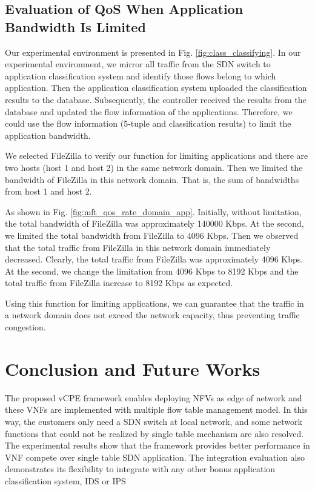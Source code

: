 \documentclass[conference]{IEEEtran}
\begin{document}
\subsection{Evaluation of QoS When Application Bandwidth Is Limited}
Our experimental environment is presented in Fig. \ref{fig:class_classifying}. In our experimental environment, we mirror all traffic from the SDN switch to application classification system and identify those flows belong to which application.
Then the application classification system uploaded the classification results to the database.
Subsequently, the controller received the results from the database and updated the flow information of the applications.
Therefore, we could use the flow information (5-tuple and classification results) to limit the application bandwidth.

We selected FileZilla to verify our function for limiting applications and there are two hosts (host 1 and host 2) in the same network domain.
Then we limited the bandwidth of FileZilla in this network domain. That is, the sum of bandwidths from host 1 and host 2.

As shown in Fig. \ref{fig:mft_qos_rate_domain_app}.
Initially, without limitation, the total bandwidth of FileZilla was approximately 140000 Kbps.
At the  second, we limited the total bandwidth from FileZilla to 4096 Kbps.
Then we observed that the total traffic from FileZilla in this network domain immediately decreased.
Clearly, the total traffic from FileZilla was approximately 4096 Kbps.
At the  second, we change the limitation from 4096 Kbps to 8192 Kbps and the total traffic from FileZilla increase to 8192 Kbps as expected.

Using this function for limiting applications, we can guarantee that the traffic in a network domain does not exceed the network capacity, thus preventing traffic congestion.




\section{Conclusion and Future Works}
The proposed vCPE framework enables deploying NFVs as edge of network and these VNFs are implemented with multiple flow table management model. In this way, the customers only need a SDN switch at local network, and some network functions that could not be realized by single table mechanism are also resolved. The experimental results show that the framework provides better performance in VNF compete over single table SDN application. The integration evaluation also demonstrates its flexibility to integrate with any other bonus application classification system, IDS or IPS
\end{document}
